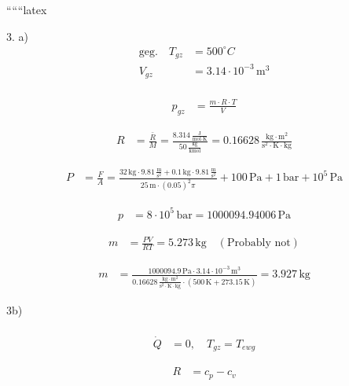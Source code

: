 
``````latex


3. a) \\
\begin{align*}
\text{geg.} \quad T_{gz} &= 500^\circ C \\
V_{gz} &= 3.14 \cdot 10^{-3} \, \text{m}^3 \\
\end{align*}

\begin{align*}
p_{gz} &= \frac{m \cdot R \cdot T}{V}
\end{align*}

\begin{align*}
R &= \frac{\bar{R}}{M} = \frac{8.314 \, \frac{\text{J}}{\text{mol} \cdot \text{K}}}{50 \, \frac{\text{kg}}{\text{kmol}}} = 0.16628 \, \frac{\text{kg} \cdot \text{m}^2}{\text{s}^2 \cdot \text{K} \cdot \text{kg}}
\end{align*}

\begin{align*}
P &= \frac{F}{A} = \frac{32 \, \text{kg} \cdot 9.81 \, \frac{\text{m}}{\text{s}^2} + 0.1 \, \text{kg} \cdot 9.81 \, \frac{\text{m}}{\text{s}^2}}{25 \, \text{m} \cdot (0.05)^2 \pi} + 100 \, \text{Pa} + 1 \, \text{bar} + 10^5 \, \text{Pa}
\end{align*}

\begin{align*}
p &= 8 \cdot 10^5 \, \text{bar} = 1 000 094.94006 \, \text{Pa}
\end{align*}

\begin{align*}
m &= \frac{PV}{RT} = 5.273 \, \text{kg} \quad (\text{Probably not})
\end{align*}

\begin{align*}
m &= \frac{1 000 094.9 \, \text{Pa} \cdot 3.14 \cdot 10^{-3} \, \text{m}^3}{0.16628 \, \frac{\text{kg} \cdot \text{m}^2}{\text{s}^2 \cdot \text{K} \cdot \text{kg}} \cdot (500 \, \text{K} + 273.15 \, \text{K})} = 3.927 \, \text{kg}
\end{align*}

3b) \\
 \\
\begin{align*}
\dot{Q} &= 0, \quad T_{gz} = T_{ewg}
\end{align*}

\begin{align*}
R &= c_p - c_v \\
\end{align*}

